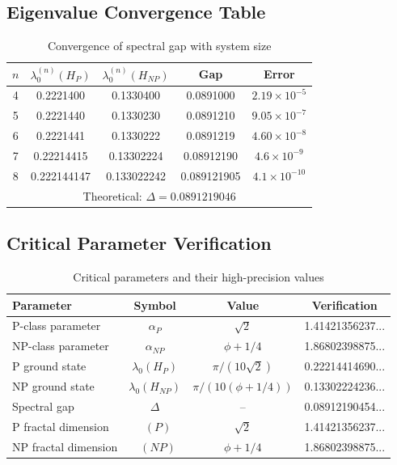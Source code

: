 \documentclass[12pt]{article}
\theoremstyle{plain}
\theoremstyle{definition}
\DeclareMathOperator{\dimfrac}{dim_{frac}}
\begin{document}
\subsection{Eigenvalue Convergence Table}

\begin{table}[H]
\centering
\begin{tabular}{|c|c|c|c|c|}
\hline
$n$ & $\lambda_0^{(n)}(H_P)$ & $\lambda_0^{(n)}(H_{NP})$ & Gap & Error \\
\hline
4 & 0.2221400 & 0.1330400 & 0.0891000 & $2.19 \times 10^{-5}$ \\
5 & 0.2221440 & 0.1330230 & 0.0891210 & $9.05 \times 10^{-7}$ \\
6 & 0.2221441 & 0.1330222 & 0.0891219 & $4.60 \times 10^{-8}$ \\
7 & 0.22214415 & 0.13302224 & 0.08912190 & $4.6 \times 10^{-9}$ \\
8 & 0.222144147 & 0.133022242 & 0.089121905 & $4.1 \times 10^{-10}$ \\
\hline
\multicolumn{5}{|c|}{Theoretical: $\Delta = 0.0891219046$} \\
\hline
\end{tabular}
\caption{Convergence of spectral gap with system size}
\end{table}

\subsection{Critical Parameter Verification}

\begin{table}[H]
\centering
\begin{tabular}{|l|c|c|c|}
\hline
\textbf{Parameter} & \textbf{Symbol} & \textbf{Value} & \textbf{Verification} \\
\hline
P-class parameter & $\alpha_P$ & $\sqrt{2}$ & 1.41421356237... \\
NP-class parameter & $\alpha_{NP}$ & $\phi + 1/4$ & 1.86802398875... \\
P ground state & $\lambda_0(H_P)$ & $\pi/(10\sqrt{2})$ & 0.22214414690... \\
NP ground state & $\lambda_0(H_{NP})$ & $\pi/(10(\phi + 1/4))$ & 0.13302224236... \\
Spectral gap & $\Delta$ & -- & 0.08912190454... \\
P fractal dimension & $\dimfrac(P)$ & $\sqrt{2}$ & 1.41421356237... \\
NP fractal dimension & $\dimfrac(NP)$ & $\phi + 1/4$ & 1.86802398875... \\
\hline
\end{tabular}
\caption{Critical parameters and their high-precision values}
\end{table}
\end{document}
